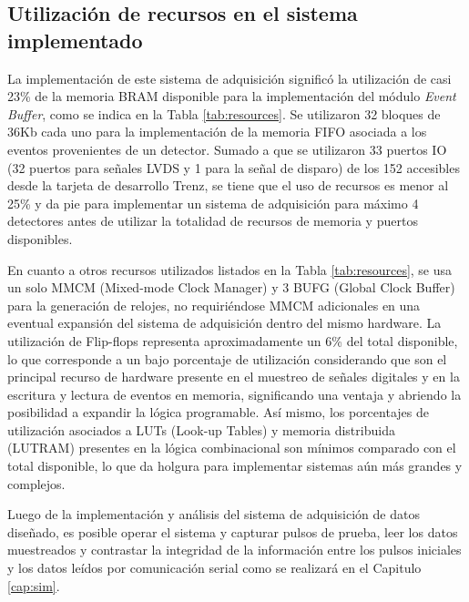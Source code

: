 	
	\subsection{Utilización de recursos en el sistema implementado}
	
	La implementación de este sistema de adquisición significó la utilización de casi 23\% de la memoria BRAM disponible para la implementación del módulo \textit{Event Buffer}, como se indica en la Tabla \ref{tab:resources}. Se utilizaron 32 bloques de 36Kb cada uno para la implementación de la memoria FIFO asociada a los eventos provenientes de un detector. Sumado a que se utilizaron 33 puertos IO (32 puertos para señales LVDS y 1 para la señal de disparo) de los 152 accesibles desde la tarjeta de desarrollo Trenz, se tiene que el uso de recursos es menor al 25\% y da pie para implementar un sistema de adquisición para máximo 4 detectores antes de utilizar la totalidad de recursos de memoria y puertos disponibles.
	
	En cuanto a otros recursos utilizados listados en la Tabla \ref{tab:resources}, se usa un solo MMCM (Mixed-mode Clock Manager) y 3 BUFG (Global Clock Buffer) para la generación de relojes, no requiriéndose MMCM adicionales en una eventual expansión del sistema de adquisición dentro del mismo hardware. La utilización de Flip-flops representa aproximadamente un 6\% del total disponible, lo que corresponde a un bajo porcentaje de utilización considerando que son el principal recurso de hardware presente en el muestreo de señales digitales y en la escritura y lectura de eventos en memoria, significando una ventaja y abriendo la posibilidad a expandir la lógica programable. Así mismo, los porcentajes de utilización asociados a LUTs (Look-up Tables) y memoria distribuida (LUTRAM) presentes en la lógica combinacional son mínimos comparado con el total disponible, lo que da holgura para implementar sistemas aún más grandes y complejos.
	
	Luego de la implementación y análisis del sistema de adquisición de datos diseñado, es posible operar el sistema y capturar pulsos de prueba, leer los datos muestreados y contrastar la integridad de la información entre los pulsos iniciales y los datos leídos por comunicación serial como se realizará en el Capitulo \ref{cap:sim}.
	
